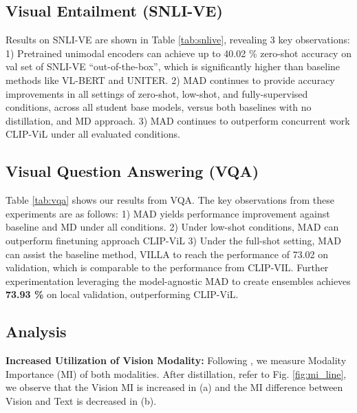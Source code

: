 \documentclass[runningheads]{llncs}
\begin{document}
\subsection{Visual Entailment (SNLI-VE)}

Results on SNLI-VE are shown in Table \ref{tab:snlive}, revealing 3 key observations: 1) Pretrained unimodal encoders can achieve up to 40.02 \% zero-shot accuracy on val set of SNLI-VE ``out-of-the-box'', which is significantly higher than baseline methods like VL-BERT and UNITER. 2) MAD continues to provide accuracy improvements in all settings of zero-shot, low-shot, and fully-supervised conditions, across all student base models, versus both baselines with no distillation, and MD approach. 3) MAD continues to outperform concurrent work CLIP-ViL under all evaluated conditions.




\subsection{Visual Question Answering (VQA)}


Table \ref{tab:vqa} shows our results from VQA. The key observations from these experiments are as follows: 1) MAD yields performance improvement against baseline and MD under all conditions. 2) Under low-shot conditions, MAD can outperform finetuning approach CLIP-ViL  3) Under the full-shot setting, MAD can assist the baseline method, VILLA to reach the performance of 73.02 on validation, which is comparable to the performance from CLIP-VIL. Further experimentation leveraging the model-agnostic MAD to create ensembles achieves \textbf{73.93 \%} on local validation, outperforming CLIP-ViL.












\subsection{Analysis}

\noindent\textbf{Increased Utilization of Vision Modality: }Following \cite{cao2020behind}, we measure Modality Importance (MI) of both modalities. After distillation, refer to Fig. \ref{fig:mi_line}, we observe that the Vision MI is increased in (a) and the MI difference between Vision and Text is decreased in (b).
\end{document}
